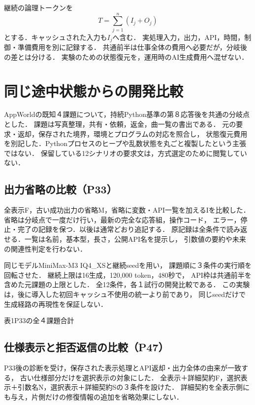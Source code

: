 \documentclass[uplatex,a4paper,twocolumn,10pt]{jsarticle}
\begin{document}
継続の論理トークンを
\begin{equation}
 T=\sum_{j=1}^{n}(I_j+O_j)
\end{equation}
とする．キャッシュされた入力も$I_j$へ含む．
実処理入力，出力，API，時間，制御・準備費用を別に記録する．
共通前半は仕事全体の費用へ必要だが，分岐後の差とは分ける．
実験のための状態復元を，運用時のAI生成費用へ混ぜない．

\clearpage
\section{同じ途中状態からの開発比較}
AppWorld\cite{appworld}の既知４課題について，持続Python基準の第８応答後を共通の分岐点とした．
課題は写真整理，共有・依頼，返金，曲一覧の書出である．
元の要求・返却，保存された境界，環境とプログラムの対応を照合し，
状態復元費用を別記した．Pythonプロセスのヒープや乱数状態を丸ごと複製したという主張ではない．
保留している12シナリオの要求文は，方式選定のために閲覧していない．

\subsection{出力省略の比較（P33）}
全表示F，古い成功出力の省略M，省略に変数・API一覧を加えるIを比較した．
省略は分岐点で一度だけ行い，最新の完全な応答組，操作コード，
エラー，停止・完了の記録を保つ．以後は通常どおり追記する．
原記録は全条件で読み返せる．一覧は名前，基本型，長さ，公開API名を提示し，
引数値の要約や未来の関連性判定を行わない．

同じモデルMiniMax-M3 IQ4\_XSと継続seedを用い，
課題順に３条件の実行順を回転させた．
継続上限は16生成，120,000 token，480秒で，
API枠は共通前半を含めた元課題の上限とした．
全12条件，各１試行の開発比較である．
この実験は，後に導入した初回キャッシュ不使用の統一より前であり，
同じseedだけで生成経路の再現性を保証しない．

\begin{center}
\begin{minipage}{\columnwidth}\centering
\small 表1\quad P33の全４課題合計\par\smallskip
\EvidencePThirtyThreeTotals
\end{minipage}
\end{center}

\newpage
\subsection{仕様表示と拒否返信の比較（P47）}
P33後の診断を受け，保存された表示処理とAPI返却・出力全体の由来が一致する，
古い仕様部分だけを選択表示の対象にした．
全表示＋詳細契約F，選択表示＋引数名N，選択表示＋詳細契約Sの３条件を設けた．
詳細契約を全表示側にも与え，片側だけの修復情報の追加を省略効果にしない．
\end{document}
